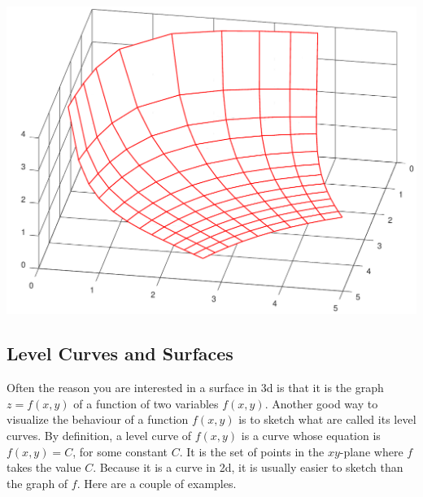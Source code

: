 \begin{eg}[$xyz=4$]
\begin{efig}
\begin{center}
   \includegraphics[scale=0.4]{xyzSurfB.pdf}\quad
\end{center}
\end{efig}

\end{eg}

\subsection{Level Curves and Surfaces}

Often the reason you are interested in a surface in 3d is that it is
the graph $z=f(x,y)$ of a function of two variables $f(x,y)$. Another good
way to visualize the behaviour of a function $f(x,y)$ is to sketch what
are called its level curves. By definition, a level curve of $f(x,y)$
is a curve whose equation is $f(x,y)=C$, for some constant $C$. It is the
set of points in the $xy$-plane where $f$ takes the value $C$. Because
it is a curve in 2d, it is usually easier to sketch than the graph of $f$.
Here are a couple of examples. 

